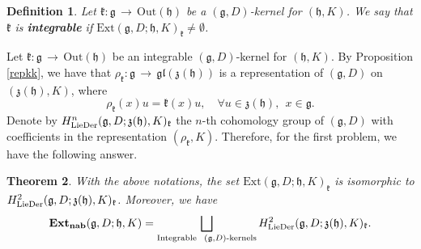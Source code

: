 \documentclass[12pt]{amsart}
\newtheorem{thm}{Theorem}[section]
\newtheorem{defi}[thm]{Definition}
\newcommand{\lon }{\,\rightarrow\,}
\newcommand{\g}{\mathfrak g}
\newcommand{\h}{\mathfrak h}
\newcommand{\frkk}{\mathfrak k}
\newcommand{\frkz}{\mathfrak z}
\newcommand{\LD}{{\rm LieDer }}
\newcommand{\Out}{\mathrm{Out}}
\newcommand{\gl}{\mathfrak {gl}}
\begin{document}
\begin{defi}
    Let $\frkk:\g\lon\Out(\h)$ be a $(\g,D)$-kernel for $(\h, K)$. We say that $\frkk$ is {\bf integrable} if $\mathrm{Ext}(\g,D;\h,K)_{\frkk}\neq \emptyset$.
\end{defi}
Let $\frkk:\g\lon\Out(\h)$ be an integrable $(\g,D)$-kernel for $(\h, K)$. By Proposition \ref{repkk}, we have that $\rho_{\frkk}:\g\lon\gl(\frkz(\h))$ is a representation of $(\g,D)$ on $(\frkz(\h),K)$, where
$$
\rho_{\frkk}(x)u=\frkk(x)u, \quad \forall u\in\frkz(\h),  ~~x\in\g.
$$
Denote by $H_{\LD}^{n}(\g, D; \frkz(\h), K)_\frkk$ the $n$-th cohomology group of $(\g, D)$ with coefficients in the representation $(\rho_\frkk, K)$. Therefore, for the first problem, we have the following answer.
\begin{thm}\label{gdk}
With the above notations, the set $\mathrm{Ext}(\g,D;\h,K)_{\frkk}$ is isomorphic to $H^2_{\LD}(\g,D;\frkz(\h),K)_{\frkk}$. Moreover, we have 
    \begin{equation*}
      {\rm{\bf Ext_{nab}}}(\g,D;\h,K)=\bigsqcup_{\text{Integrable}~~(\g,D)\text{-kernels}}H^2_{\LD}(\g,D; \frkz(\h), K)_{\frkk}.
    \end{equation*}
    \end{thm}
\end{document}
